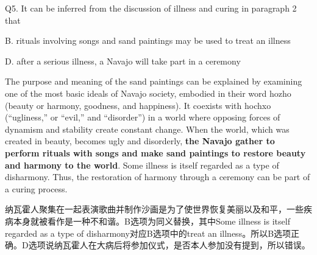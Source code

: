 \begin{blk}
    \begin{qst}
        Q5. It can be inferred from the discussion of illness and curing in paragraph 2 that
    \end{qst}

    \begin{chc}
        B. rituals involving songs and sand paintings may be used to treat an illness

        D. after a serious illness, a Navajo will take part in a ceremony
    \end{chc}

    \begin{psgq}
        The purpose and meaning of the sand paintings can be explained by examining one of the most basic ideals of Navajo society, embodied in their word hozho (beauty or harmony, goodness, and happiness). It coexists with hochxo (“ugliness,” or “evil,” and “disorder”) in a world where opposing forces of dynamism and stability create constant change. When the world, which was created in beauty, becomes ugly and disorderly, \textbf{the Navajo gather to perform rituals with songs and make sand paintings to restore beauty and harmony to the world}. Some illness is itself regarded as a type of disharmony. Thus, the restoration of harmony through a ceremony can be part of a curing process.
    \end{psgq}

    \begin{nlz}
        纳瓦霍人聚集在一起表演歌曲并制作沙画是为了使世界恢复美丽以及和平，一些疾病本身就被看作是一种不和谐。B选项为同义替换，其中Some illness is itself regarded as a type of disharmony对应B选项中的treat an illness。所以B选项正确。D选项说纳瓦霍人在大病后将参加仪式，是否本人参加没有提到，所以错误。
    \end{nlz}
\end{blk}

\newpage